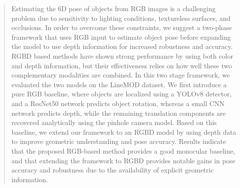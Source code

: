 \begin{abstract}
Estimating the 6D pose of objects from RGB images is a challenging problem due to sensitivity to lighting conditions, textureless surfaces, and occlusions. In order to overcome these constraints, we suggest a two-phase framework that uses RGB input to estimate object pose before expanding the model to use depth information for increased robustness and accuracy.
RGBD based methods have shown strong performance by using both color and depth information, but their effectiveness relies on how well these two complementary modalities are combined. In this two stage framework, we evaluated the two models on the LineMOD dataset. We first introduce a pure RGB baseline, where objects are localized using a YOLOv8 detector, and a ResNet50 network predicts object rotation, whereas a small CNN network predicts depth, while the remaining translation components are recovered analytically using the pinhole camera model. Based on this baseline, we extend our framework to an RGBD model by using depth data to improve geometric understanding and pose accuracy. Results indicate that the proposed RGB-based method provides a good monocular baseline, and that extending the framework to RGBD provides notable gains in pose accuracy and robustness due to the availability of explicit geometric information.
\end{abstract}